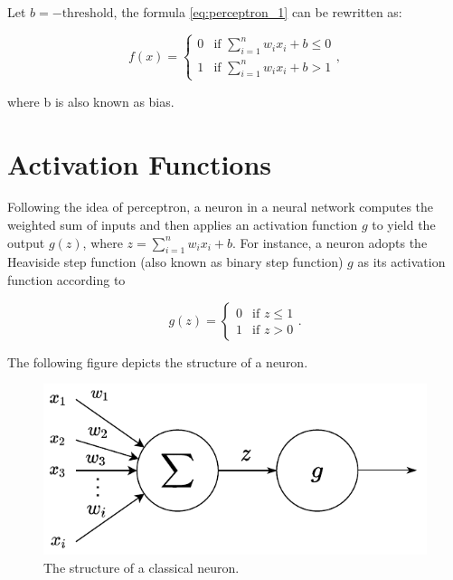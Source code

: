 \documentclass[
	parskip, 			   %
	twoside, 			   %
	DIV=14, 			   %
	BCOR=15.0mm, 		   %
	headsepline, 		   %
	open=right, 		   %
	captions=tableheading, %
	bibliography=totoc,    %
	numbers=noenddot       %
]{scrreprt}
\begin{document}
Let $b=-\text{threshold}$, the formula \ref{eq:perceptron_1} can be rewritten as:

\begin{equation}
    \label{eq:perceptron_2}
    f(x)=\begin{cases}0 & \text{if } \sum\nolimits_{i=1}^n w_{i} x_{i}+b \leq 0 \\ 1 & \text{if } \sum\nolimits_{i=1}^n w_{i} x_{i}+b>1\end{cases},
\end{equation}

where b is also known as bias. 

\section{Activation Functions}
Following the idea of perceptron, a neuron in a neural network computes the weighted sum of inputs and then applies an activation function $g$ to yield the output $g(z)$, where $z=\sum\nolimits_{i=1}^n w_{i} x_{i} + b$. For instance, a neuron adopts the Heaviside step function (also known as binary step function) $g$ as its activation function according to

\begin{equation}
    \label{eq:activation_function}
    g(z)=\begin{cases} 0 & \text{if } z\leq 1 \\ 1  & \text{if } z>0
    \end{cases}.
\end{equation}

The following figure depicts the structure of a neuron.

\begin{figure}[h!]
    \centering
    \includegraphics[scale=1]{figures/activation_function.pdf}
    \caption{The structure of a classical neuron.}
    \label{fig:neuron_structure}
\end{figure}
\end{document}

